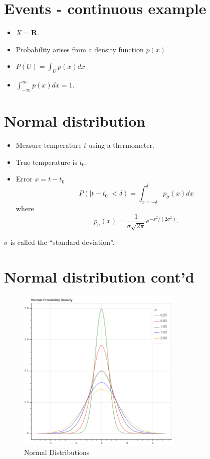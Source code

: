 \documentclass[
]{article}
\begin{document}
\hypertarget{events---continuous-example}{%
\section{Events - continuous
example}\label{events---continuous-example}}

\begin{itemize}
\item
  \(X=\mathbf{R}\).
\item
  Probability arises from a density function \(p(x)\)
\item
  \(P(U) = \int_{U} p(x)dx\)
\item
  \(\int_{-\infty}^{\infty}p(x)dx=1\).
\end{itemize}

\hypertarget{normal-distribution}{%
\section{Normal distribution}\label{normal-distribution}}

\begin{itemize}
\item
  Measure temperature \(t\) using a thermometer.
\item
  True temperature is \(t_{0}\).
\item
  Error \(x=t-t_{0}\) \[
  P(|t-t_{0}|<\delta) =\int_{x=-\delta}^{\delta} p_{\sigma}(x)dx
  \] where \[
  p_{\sigma}(x) = \frac{1}{\sigma\sqrt{2\pi}}e^{-x^2/(2\sigma^2)}.
  \]
\end{itemize}

\(\sigma\) is called the ``standard deviation''.

\hypertarget{normal-distribution-contd}{%
\section{Normal distribution cont'd}\label{normal-distribution-contd}}

\begin{figure}
\centering
\includegraphics[width=0.7\textwidth,height=\textheight]{../img/density.png}
\caption{Normal Distributions}
\end{figure}
\end{document}
